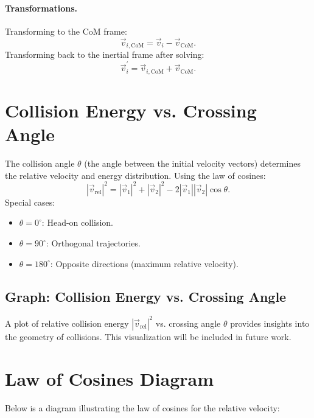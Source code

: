 \documentclass[12pt]{article}
\begin{document}
\paragraph{Transformations.} Transforming to the CoM frame:
\begin{equation}
    \vec{v}_{i, \text{CoM}} = \vec{v}_{i} - \vec{v}_{\text{CoM}}.
\end{equation}
Transforming back to the inertial frame after solving:
\begin{equation}
    \vec{v}_{i}^{\prime} = \vec{v}_{i, \text{CoM}} + \vec{v}_{\text{CoM}}.
\end{equation}

\section{Collision Energy vs. Crossing Angle}
The collision angle $\theta$ (the angle between the initial velocity vectors) determines the relative velocity and energy distribution. Using the law of cosines:
\begin{equation}
    |\vec{v}_{\text{rel}}|^2 = |\vec{v}_{1}|^2 + |\vec{v}_{2}|^2 - 2|\vec{v}_{1}||\vec{v}_{2}|\cos\theta.
\end{equation}
Special cases:
\begin{itemize}
    \item $\theta = 0^\circ$: Head-on collision.
    \item $\theta = 90^\circ$: Orthogonal trajectories.
    \item $\theta = 180^\circ$: Opposite directions (maximum relative velocity).
\end{itemize}

\subsection{Graph: Collision Energy vs. Crossing Angle}
A plot of relative collision energy $|\vec{v}_{\text{rel}}|^2$ vs. crossing angle $\theta$ provides insights into the geometry of collisions. This visualization will be included in future work.

\section{Law of Cosines Diagram}
Below is a diagram illustrating the law of cosines for the relative velocity:

\begin{center}
\end{center}
\end{document}
